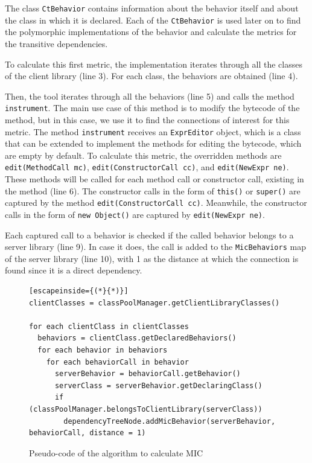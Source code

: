 The class \texttt{CtBehavior} contains information about the behavior itself and about the class in which it is declared. Each of the \texttt{CtBehavior} is used later on to find the polymorphic implementations of the behavior and calculate the metrics for the transitive dependencies.

To calculate this first metric, the implementation iterates through all the classes of the client library (line 3). For each class, the behaviors are obtained (line 4).

Then, the tool iterates through all the behaviors (line 5) and calls the method \texttt{instrument}. The main use case of this method is to modify the bytecode of the method, but in this case, we use it to find the connections of interest for this metric. The method \texttt{instrument} receives an \texttt{ExprEditor} object, which is a class that can be extended to implement the methods for editing the bytecode, which are empty by default. To calculate this metric, the overridden methods are \texttt{edit(MethodCall mc)}, \texttt{edit(ConstructorCall cc)}, and \texttt{edit(NewExpr ne)}. These methods will be called for each method call or constructor call, existing in the method (line 6). The constructor calls in the form of \texttt{this()} or \texttt{super()} are captured by the method \texttt{edit(ConstructorCall cc)}. Meanwhile, the constructor calls in the form of \texttt{new Object()} are captured by \texttt{edit(NewExpr ne)}.

Each captured call to a behavior is checked if the called behavior belongs to a server library (line 9). In case it does, the call is added to the \texttt{MicBehaviors} map of the server library (line 10), with 1 as the distance at which the connection is found since it is a direct dependency.

\begin{figure}[ht!]
\begin{lstlisting}[escapeinside={(*}{*)}]
clientClasses = classPoolManager.getClientLibraryClasses()

for each clientClass in clientClasses
  behaviors = clientClass.getDeclaredBehaviors()
  for each behavior in behaviors
    for each behaviorCall in behavior
      serverBehavior = behaviorCall.getBehavior()
      serverClass = serverBehavior.getDeclaringClass()
      if (classPoolManager.belongsToClientLibrary(serverClass))
        dependencyTreeNode.addMicBehavior(serverBehavior, behaviorCall, distance = 1)
\end{lstlisting}
\caption{Pseudo-code of the algorithm to calculate MIC}
\label{fig:algorithm-mic}
\end{figure}

